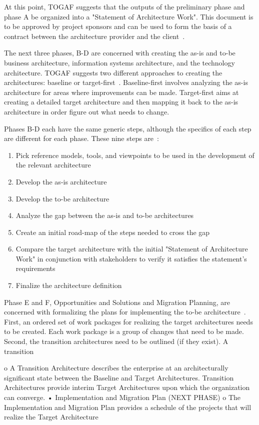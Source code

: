 At this point, TOGAF suggests that the outputs of the preliminary phase and phase A be organized into a "Statement of Architecture Work". This document is to be approved by project sponsors and can be used to form the basis of a contract between the architecture provider and the client~\cite{togaf9.1}.

The next three phases, B-D are concerned with creating the as-is and to-be business architecture, information systems architecture, and the technology architecture. TOGAF suggests two different approaches to creating the architectures: baseline or target-first~\cite{togaf9.1}. Baseline-first involves analyzing the as-is architecture for areas where improvements can be made. Target-first aims at creating a detailed target architecture and then mapping it back to the as-is architecture in order figure out what needs to change. 

Phases B-D each have the same generic steps, although the specifics of each step are different for each phase. These nine steps are~\cite{togaf9.1}:
\begin{enumerate}
    \item Pick reference models, tools, and viewpoints to be used in the development of the relevant architecture
    \item Develop the as-is architecture
    \item Develop the to-be architecture
    \item Analyze the gap between the as-is and to-be architectures
    \item Create an initial road-map of the steps needed to cross the gap
    \item Compare the target architecture with the initial "Statement of Architecture Work" in conjunction with stakeholders to verify it satisfies the statement's requirements
    \item Finalize the architecture definition
\end{enumerate}

Phase E and F, Opportunities and Solutions and Migration Planning, are concerned with formalizing the plans for implementing the to-be architecture~\cite{togaf9.1}. First, an ordered set of work packages for realizing the target architectures needs to be created. Each work package is a group of changes that need to be made. Second, the transition architectures need to be outlined (if they exist). A transition 


o	A Transition Architecture describes the enterprise at an architecturally significant state between the Baseline and Target Architectures. Transition Architectures provide interim Target Architectures upon which the organization can converge.
•	Implementation and Migration Plan (NEXT PHASE)
o	The Implementation and Migration Plan provides a schedule of the projects that will  realize the Target Architecture



